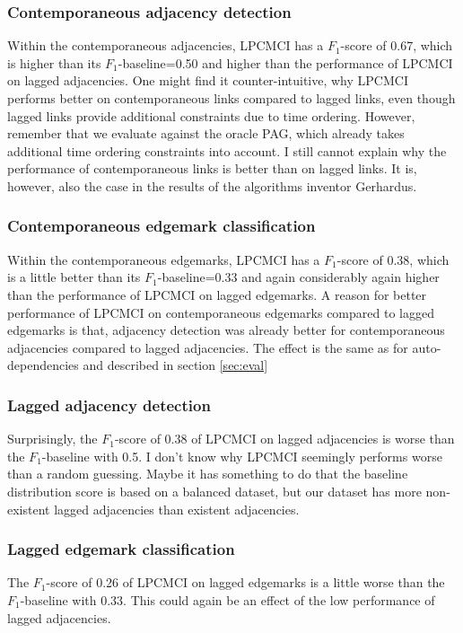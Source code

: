 \documentclass[conference]{IEEEtran}
\begin{document}
\subsubsection{Contemporaneous adjacency detection}
Within the contemporaneous adjacencies, LPCMCI has a $F_1$-score of 0.67, which is higher than its $F_1$-baseline=0.50 and higher than the performance of LPCMCI on lagged adjacencies.
One might find it counter-intuitive, why LPCMCI performs better on contemporaneous links compared to lagged links, even though lagged links provide additional constraints due to time ordering. However, remember that we evaluate against the oracle PAG, which already takes additional time ordering constraints into account.
I still cannot explain why the performance of contemporaneous links is better than on lagged links.
It is, however, also the case in the results of the algorithms inventor Gerhardus\cite{gerhardus_high-recall_2021}.

\subsubsection{Contemporaneous edgemark classification}
Within the contemporaneous edgemarks, LPCMCI has a $F_1$-score of 0.38, which is a little better than its $F_1$-baseline=0.33 and again considerably again higher than the performance of LPCMCI on lagged edgemarks.
A reason for better performance of LPCMCI on contemporaneous edgemarks compared to lagged edgemarks is that, adjacency detection was already better for contemporaneous adjacencies compared to lagged adjacencies. The effect is the same as for auto-dependencies and described in section \ref{sec:eval}

\subsubsection{Lagged adjacency detection}
Surprisingly, the $F_1$-score of 0.38 of LPCMCI on lagged adjacencies is worse than the $F_1$-baseline with 0.5. I don't know why LPCMCI seemingly performs worse than a random guessing. Maybe it has something to do that the baseline distribution score is based on a balanced dataset, but our dataset has more non-existent lagged adjacencies than existent adjacencies.

\subsubsection{Lagged edgemark classification}
The $F_1$-score of 0.26 of LPCMCI on lagged edgemarks is a little worse than the $F_1$-baseline with 0.33.
This could again be an effect of the low performance of lagged adjacencies.
\end{document}

